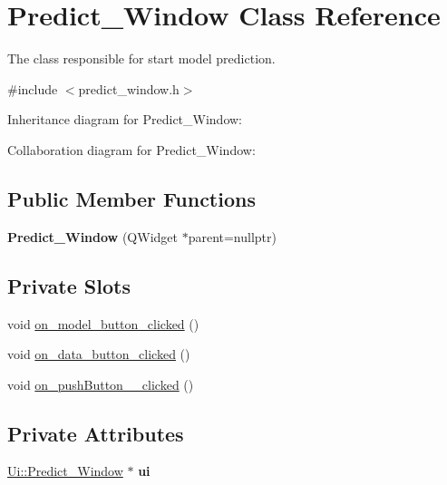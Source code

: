 \hypertarget{classPredict__Window}{}\section{Predict\+\_\+\+Window Class Reference}
\label{classPredict__Window}


The class responsible for start model prediction.  




{\ttfamily \#include $<$predict\+\_\+window.\+h$>$}



Inheritance diagram for Predict\+\_\+\+Window\+:


Collaboration diagram for Predict\+\_\+\+Window\+:
\subsection*{Public Member Functions}
\begin{DoxyCompactItemize}
\item 
\mbox{\label{classPredict__Window_a3393ac1ddc257b0cc9b5cd0443a18fb8}} 
{\bfseries Predict\+\_\+\+Window} (Q\+Widget $\ast$parent=nullptr)
\end{DoxyCompactItemize}
\subsection*{Private Slots}
\begin{DoxyCompactItemize}
\item 
void \hyperlink{classPredict__Window_a515cd0039c4f7baff0d55af7e290403e}{on\+\_\+model\+\_\+button\+\_\+clicked} ()
\item 
void \hyperlink{classPredict__Window_a3b6a721c8baee978c72a5b2895d27be5}{on\+\_\+data\+\_\+button\+\_\+clicked} ()
\item 
void \hyperlink{classPredict__Window_a4b99e969bf0485922ee03081503e019a}{on\+\_\+push\+Button\+\_\+\_\+clicked} ()
\end{DoxyCompactItemize}
\subsection*{Private Attributes}
\begin{DoxyCompactItemize}
\item 
\mbox{\label{classPredict__Window_aa8b4b5cc8c59bbe10e4fe549ef5d51ee}} 
\hyperlink{classUi_1_1Predict__Window}{Ui\+::\+Predict\+\_\+\+Window} $\ast$ {\bfseries ui}
\end{DoxyCompactItemize}


